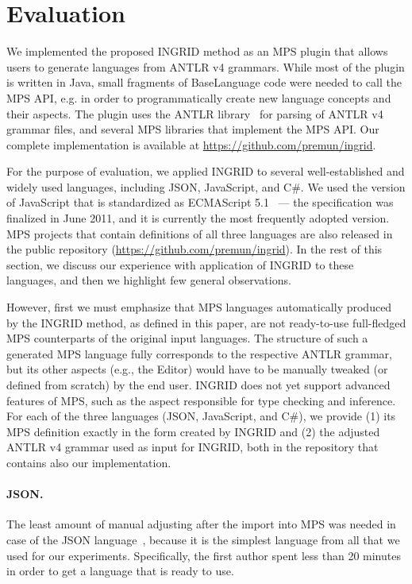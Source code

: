 \section{Evaluation}
\label{sect:EVAL}

We implemented the proposed INGRID method as an MPS plugin that allows users to generate languages from ANTLR v4 grammars.
While most of the plugin is written in Java, small fragments of BaseLanguage code were needed to call the MPS API, e.g. in order to programmatically create new language concepts and their aspects.
The plugin uses the ANTLR library~\cite{ref:ANTLR} for parsing of ANTLR v4 grammar files, and several MPS libraries that implement the MPS API.
Our complete implementation is available at \url{https://github.com/premun/ingrid}.

For the purpose of evaluation, we applied INGRID to several well-established and widely used languages, including JSON, JavaScript, and C\#.
We used the version of JavaScript that is standardized as ECMAScript 5.1~\cite{ref:ECMASCRIPT51} --- the specification was finalized in June 2011, and it is currently the most frequently adopted version.
MPS projects that contain definitions of all three languages are also released in the public repository (\url{https://github.com/premun/ingrid}).
In the rest of this section, we discuss our experience with application of INGRID to these languages, and then we highlight few general observations.

However, first we must emphasize that MPS languages automatically produced by the INGRID method, as defined in this paper, are not ready-to-use full-fledged MPS counterparts of the original input languages.
The structure of such a generated MPS language fully corresponds to the respective ANTLR grammar, but its other aspects (e.g., the Editor) would have to be manually tweaked (or defined from scratch) by the end user.
INGRID does not yet support advanced features of MPS, such as the aspect responsible for type checking and inference.
For each of the three languages (JSON, JavaScript, and C\#), we provide (1) its MPS definition exactly in the form created by INGRID and (2) the adjusted ANTLR v4 grammar used as input for INGRID, both in the repository that contains also our implementation.

\paragraph{JSON.}
The least amount of manual adjusting after the import into MPS was needed in case of the JSON language~\cite{ref:JSON}, because it is the simplest language from all that we used for our experiments.
Specifically, the first author spent less than 20 minutes in order to get a language that is ready to use.

